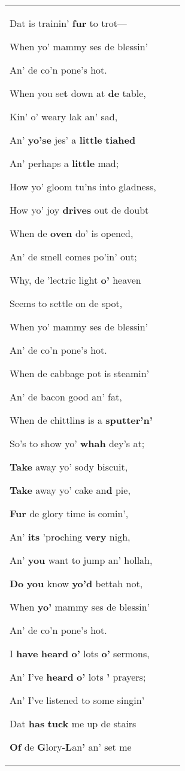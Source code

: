 \begin{table}[t]
\begin{tabularx}{\textwidth}{XXX}
Dat is trainin’ \textbf{fur} to trot—

When yo’ mammy ses de blessin’

An’ de co’n pone’s hot.

When you se\textbf{t} down at \textbf{de} table,

Kin’ o’ weary lak an’ sad,

An’ \textbf{yo’se} jes’ a \textbf{little} \textbf{tiahed}

An’ perhaps a \textbf{little} mad;

How yo’ gloom tu’ns into gladness,

How yo’ joy \textbf{drives} out de doubt

When de \textbf{oven} do’ is opened,

An’ de smell comes po’in’ out;

Why, de ’lectric light \textbf{o’} heaven

Seems to settle on de spot,

When yo’ mammy ses de blessin’

An’ de co’n pone’s hot.

When de cabbage pot is steamin’

An’ de bacon good an’ fat,

When de chittlin\textbf{s} is a \textbf{sputter’n’}

So’s to show yo’ \textbf{whah} dey’s at;

\textbf{Take} away yo’ sody biscuit,

\textbf{Take} away yo’ cake an\textbf{d} pie,

\textbf{Fur} de glory time is comin’,

An’ \textbf{its} ’pr\textbf{o}ching \textbf{very} nigh,

An’ \textbf{you} want to jump an’ hollah,

\textbf{Do} \textbf{you} know \textbf{yo’d} bettah not,

When \textbf{yo’} mammy ses de blessin’

An’ de co’n pone’s hot.

I \textbf{have} \textbf{heard} \textbf{o’} lots \textbf{o’} sermons,

An’ I’ve \textbf{heard} \textbf{o’} lots \textbf{’} prayers;

An’ I’ve listened to some singin’

Dat \textbf{has} \textbf{tuck} me up de stairs

\textbf{Of} de \textbf{G}lory-\textbf{L}an\textbf{’} an’ set me


\end{tabularx}
\end{table}
